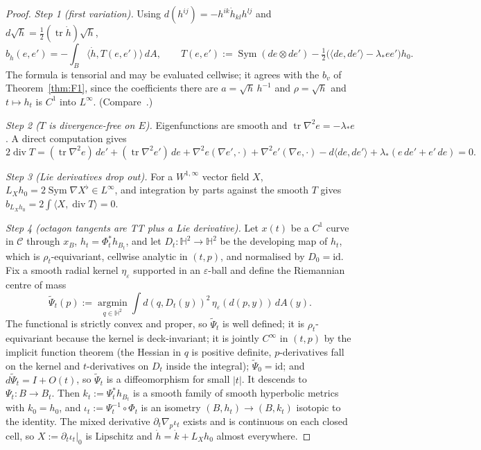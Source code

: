 \documentclass[11pt]{amsart}
\theoremstyle{definition}
\theoremstyle{remark}
\newcommand{\Hyp}{\mathbb{H}^2}
\newcommand{\Oct}{\mathcal{C}}
\newcommand{\Sym}{\operatorname{Sym}}
\newcommand{\tr}{\operatorname{tr}}
\newcommand{\ls}{\lambda_*}
\newcommand{\xB}{x_B}
\begin{document}
\begin{proof}
\emph{Step 1 (first variation).} Using $d(h^{ij})=-h^{ik}\dot h_{kl}h^{lj}$ and
$d\sqrt h=\tfrac12(\tr\dot h)\sqrt h$,
\[
b_{\dot h}(e,e')=-\int_B\langle\dot h,T(e,e')\rangle\,dA,\qquad
T(e,e'):=\Sym(de\otimes de')-\tfrac12\big(\langle de,de'\rangle-\ls ee'\big)h_0 .
\]
The formula is tensorial and may be evaluated cellwise; it agrees with the $b_v$ of
Theorem~\ref{thm:F1}, since the coefficients there are $a=\sqrt h\,h^{-1}$ and $\rho=\sqrt h$ and
$t\mapsto h_t$ is $C^1$ into $L^\infty$. (Compare~\cite[Lemma~2.1]{ESI}.)

\emph{Step 2 ($T$ is divergence-free on $E$).} Eigenfunctions are smooth and
$\tr\nabla^2e=-\ls e$. A direct computation gives
\[
2\operatorname{div}T=(\tr\nabla^2e)\,de'+(\tr\nabla^2e')\,de+\nabla^2e(\nabla e',\cdot)+\nabla^2e'(\nabla e,\cdot)
-d\langle de,de'\rangle+\ls(e\,de'+e'\,de)=0 .
\]

\emph{Step 3 (Lie derivatives drop out).} For a $W^{1,\infty}$ vector field $X$,
$L_Xh_0=2\Sym\nabla X^\flat\in L^\infty$, and integration by parts against the smooth $T$ gives
$b_{L_Xh_0}=2\int\langle X,\operatorname{div}T\rangle=0$.

\emph{Step 4 (octagon tangents are TT plus a Lie derivative).} Let $x(t)$ be a $C^1$ curve in
$\Oct$ through $\xB$, $h_t=\Phi_t^*h_{B_t}$, and let $D_t\colon\Hyp\to\Hyp$ be the developing map
of $h_t$, which is $\rho_t$-equivariant, cellwise analytic in $(t,p)$, and normalised by $D_0=\mathrm{id}$.
Fix a smooth radial kernel $\eta_\varepsilon$ supported in an $\varepsilon$-ball and define the
Riemannian centre of mass
\[
\tilde\Psi_t(p):=\operatorname*{argmin}_{q\in\Hyp}\int d(q,D_t(y))^2\,\eta_\varepsilon(d(p,y))\,dA(y).
\]
The functional is strictly convex and proper, so $\tilde\Psi_t$ is well defined; it is
$\rho_t$-equivariant because the kernel is deck-invariant; it is jointly $C^\infty$ in $(t,p)$ by
the implicit function theorem (the Hessian in $q$ is positive definite, $p$-derivatives fall on
the kernel and $t$-derivatives on $D_t$ inside the integral); $\tilde\Psi_0=\mathrm{id}$; and
$d\tilde\Psi_t=I+O(t)$, so $\tilde\Psi_t$ is a diffeomorphism for small $|t|$. It descends to
$\Psi_t\colon B\to B_t$. Then $k_t:=\Psi_t^*h_{B_t}$ is a smooth family of smooth hyperbolic metrics
with $k_0=h_0$, and $\iota_t:=\Psi_t^{-1}\circ\Phi_t$ is an isometry $(B,h_t)\to(B,k_t)$ isotopic to
the identity. The mixed derivative $\partial_t\nabla_p\iota_t$ exists and is continuous on each
closed cell, so $X:=\partial_t\iota_t|_0$ is Lipschitz and $\dot h=\dot k+L_Xh_0$ almost everywhere.


\end{proof}
\end{document}
